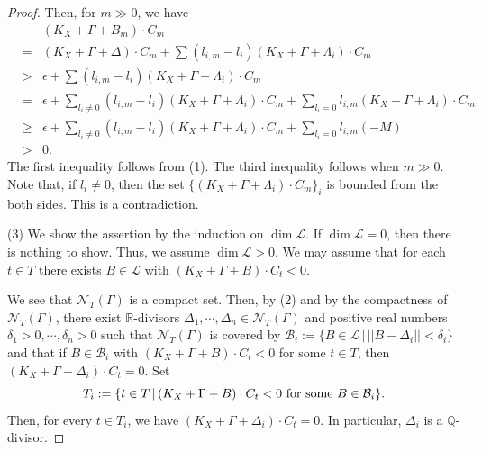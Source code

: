 \documentclass[12pt,twoside]{amsart}
\theoremstyle{definition}
\newcommand{\Q}{$\mathbb{Q}$}
\newcommand{\R}{$\mathbb{R}$}
\begin{document}
\begin{proof}
Then, for $m\gg 0$, we have 
\begin{eqnarray*}
&&(K_X+\Gamma+B_m)\cdot C_m\\
&=&
(K_X+\Gamma+\Delta)\cdot C_m+
\sum (l_{i,m}-l_i)(K_X+\Gamma+\Lambda_i)\cdot C_m\\
&>&\epsilon+\sum (l_{i,m}-l_i)(K_X+\Gamma+\Lambda_i)\cdot C_m\\
&=&\epsilon+\sum_{l_i\neq 0} (l_{i,m}-l_i)(K_X+\Gamma+\Lambda_i)\cdot C_m
+\sum_{l_i=0} l_{i,m}(K_X+\Gamma+\Lambda_i)\cdot C_m\\
&\geq&\epsilon
+\sum_{l_i\neq 0} (l_{i,m}-l_i)(K_X+\Gamma+\Lambda_i)\cdot C_m
+\sum_{l_i=0} l_{i,m}(-M)\\
&>&0.
\end{eqnarray*}
The first inequality follows from (1). 
The third inequality follows when $m\gg 0$. 
Note that, if $l_i\neq 0$, then 
the set $\{(K_X+\Gamma+\Lambda_i)\cdot C_m\}_i$ is bounded from the both sides. 
This is a contradiction. 

(3)
We show the assertion by the induction on 
$\dim \mathcal L$. 
If $\dim \mathcal L=0$, then there is nothing to show. 
Thus, we assume $\dim \mathcal L>0$. 
We may assume that for each $t \in T$ 
there exists $B\in \mathcal{L}$ with $(K_X+\Gamma+B)\cdot C_t<0$. 


We see that $\mathcal{N}_T(\Gamma)$ is a compact set. 
Then, by (2) and by the compactness of $\mathcal{N}_T(\Gamma)$, 
there exist \R-divisors $\Delta_1, \cdots, \Delta_n \in \mathcal{N}_T(\Gamma)$ 
and positive real numbers $\delta_1>0, \cdots, \delta_n>0$ such that
$\mathcal{N}_T(\Gamma)$ is covered by 
$\mathcal B_i:=\{B\in \mathcal L\,|\,||B-\Delta_i||<\delta_i\}$ 
and that if $B\in \mathcal B_i$ 
with $(K_X+\Gamma+B)\cdot C_t<0$ for some $t\in T$, 
then $(K_X+\Gamma+\Delta_i)\cdot C_t=0$. 
Set 
$$T_i:=\{t\in T\,|\,(K_X+\Gamma+B)\cdot C_t<0 
\,\,{\rm for\,\, some}\,\, B\in\mathcal B_i\}. $$
Then, for every $t\in T_i$, we have 
$(K_X+\Gamma+\Delta_i)\cdot C_t=0$. 
In particular, $\Delta_i$ is a \Q-divisor. 


\end{proof}
\end{document}
